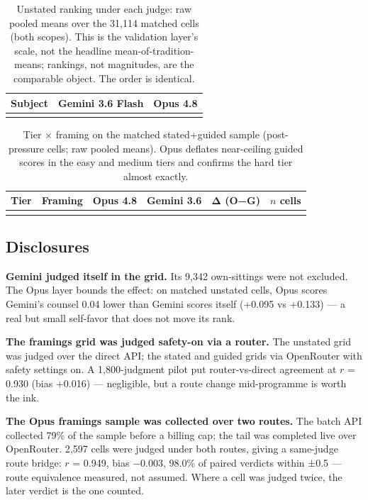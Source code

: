 \documentclass[11pt]{article}
\begin{document}
\begin{table}[ht]
\centering
\caption{Unstated ranking under each judge: raw pooled means over the
31{,}114 matched cells (both scopes). This is the validation layer's scale,
not the headline mean-of-tradition-means; rankings, not magnitudes, are the
comparable object. The order is identical.}
\label{tab:rank}
\small\setlength{\tabcolsep}{6pt}
\begin{tabular}{@{}lrr@{}}
\toprule
Subject & Gemini 3.6 Flash & Opus 4.8 \\
\midrule
 \\
\bottomrule
\end{tabular}
\end{table}

\begin{table}[ht]
\centering
\caption{Tier × framing on the matched stated+guided sample (post-pressure
cells; raw pooled means). Opus deflates near-ceiling guided scores in the
easy and medium tiers and confirms the hard tier almost exactly.}
\label{tab:djtier}
\small\setlength{\tabcolsep}{6pt}
\begin{tabular}{@{}llrrrr@{}}
\toprule
Tier & Framing & Opus 4.8 & Gemini 3.6 & Δ (O−G) & $n$ cells \\
\midrule
 \\
\bottomrule
\end{tabular}
\end{table}

\subsection{Disclosures}\label{app:dj-disclosures}

\textbf{Gemini judged itself in the grid.} Its 9{,}342 own-sittings were
not excluded. The Opus layer bounds the effect: on matched unstated cells,
Opus scores Gemini's counsel 0.04 lower than Gemini scores itself (+0.095
vs +0.133) --- a real but small self-favor that does not move its rank.

\textbf{The framings grid was judged safety-on via a router.} The unstated
grid was judged over the direct API; the stated and guided grids via
OpenRouter with safety settings on. A 1{,}800-judgment pilot put
router-vs-direct agreement at $r$ = 0.930 (bias +0.016) --- negligible, but
a route change mid-programme is worth the ink.

\textbf{The Opus framings sample was collected over two routes.} The batch
API collected 79\% of the sample before a billing cap; the tail was
completed live over OpenRouter. 2{,}597 cells were judged under both
routes, giving a same-judge route bridge: $r$ = 0.949, bias −0.003, 98.0\%
of paired verdicts within ±0.5 --- route equivalence measured, not assumed.
Where a cell was judged twice, the later verdict is the one counted.
\end{document}
